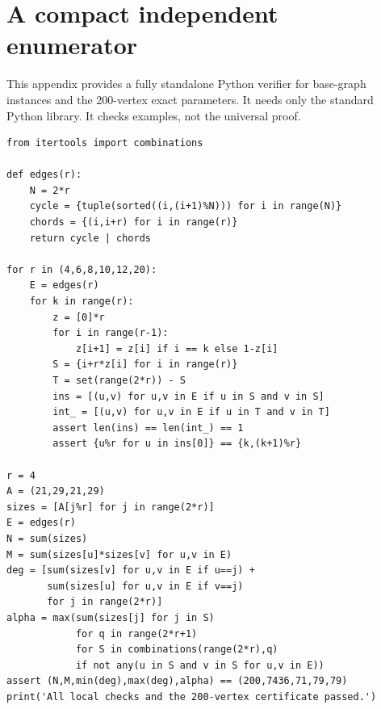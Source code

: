 \documentclass[11pt,a4paper]{article}
\begin{document}
\section{A compact independent enumerator}
This appendix provides a fully standalone Python verifier for base-graph instances and the 200-vertex exact parameters. It needs only the standard Python library. It checks examples, not the universal proof.
\begin{lstlisting}[style=py,caption={Independent exact-arithmetic validation; Python 3, no external dependencies.}]
from itertools import combinations

def edges(r):
    N = 2*r
    cycle = {tuple(sorted((i,(i+1)%N))) for i in range(N)}
    chords = {(i,i+r) for i in range(r)}
    return cycle | chords

for r in (4,6,8,10,12,20):
    E = edges(r)
    for k in range(r):
        z = [0]*r
        for i in range(r-1):
            z[i+1] = z[i] if i == k else 1-z[i]
        S = {i+r*z[i] for i in range(r)}
        T = set(range(2*r)) - S
        ins = [(u,v) for u,v in E if u in S and v in S]
        int_ = [(u,v) for u,v in E if u in T and v in T]
        assert len(ins) == len(int_) == 1
        assert {u%r for u in ins[0]} == {k,(k+1)%r}

r = 4
A = (21,29,21,29)
sizes = [A[j%r] for j in range(2*r)]
E = edges(r)
N = sum(sizes)
M = sum(sizes[u]*sizes[v] for u,v in E)
deg = [sum(sizes[v] for u,v in E if u==j) +
       sum(sizes[u] for u,v in E if v==j)
       for j in range(2*r)]
alpha = max(sum(sizes[j] for j in S)
            for q in range(2*r+1)
            for S in combinations(range(2*r),q)
            if not any(u in S and v in S for u,v in E))
assert (N,M,min(deg),max(deg),alpha) == (200,7436,71,79,79)
print('All local checks and the 200-vertex certificate passed.')
\end{lstlisting}
\end{document}
